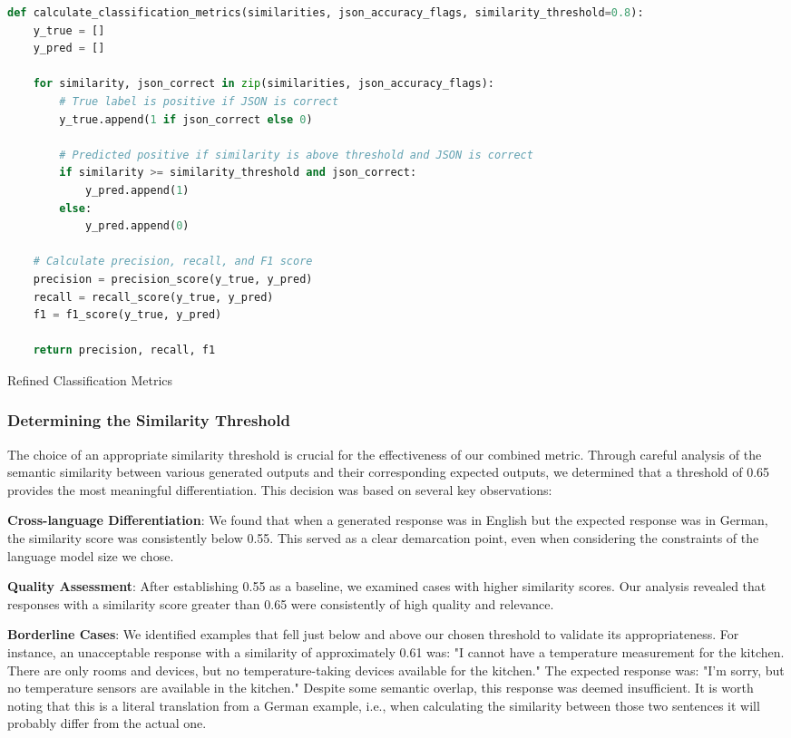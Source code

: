 \begin{Listing}
    \begin{lstlisting}[language=Python]
    def calculate_classification_metrics(similarities, json_accuracy_flags, similarity_threshold=0.8):
    y_true = []
    y_pred = []

    for similarity, json_correct in zip(similarities, json_accuracy_flags):
        # True label is positive if JSON is correct
        y_true.append(1 if json_correct else 0)

        # Predicted positive if similarity is above threshold and JSON is correct
        if similarity >= similarity_threshold and json_correct:
            y_pred.append(1)
        else:
            y_pred.append(0)

    # Calculate precision, recall, and F1 score
    precision = precision_score(y_true, y_pred)
    recall = recall_score(y_true, y_pred)
    f1 = f1_score(y_true, y_pred)

    return precision, recall, f1
  \end{lstlisting}
    \caption{Refined Classification Metrics}
    \label{lst:classificationRefined}
\end{Listing}

\subsubsection{Determining the Similarity Threshold}
The choice of an appropriate similarity threshold is crucial for the effectiveness of our combined metric. Through careful analysis of the semantic similarity between various generated outputs and their corresponding expected outputs, we determined that a threshold of 0.65 provides the most meaningful differentiation. This decision was based on several key observations:

\textbf{Cross-language Differentiation}: We found that when a generated response was in English but the expected response was in German, the similarity score was consistently below 0.55. This served as a clear demarcation point, even when considering the constraints of the language model size we chose.

\textbf{Quality Assessment}: After establishing 0.55 as a baseline, we examined cases with higher similarity scores. Our analysis revealed that responses with a similarity score greater than 0.65 were consistently of high quality and relevance.

\textbf{Borderline Cases}: We identified examples that fell just below and above our chosen threshold to validate its appropriateness. For instance, an unacceptable response with a similarity of approximately 0.61 was: "I cannot have a temperature measurement for the kitchen. There are only rooms and devices, but no temperature-taking devices available for the kitchen." The expected response was: "I'm sorry, but no temperature sensors are available in the kitchen." Despite some semantic overlap, this response was deemed insufficient.
It is worth noting that this is a literal translation from a German example, i.e., when calculating the similarity between those two sentences it will probably differ from the actual one.


